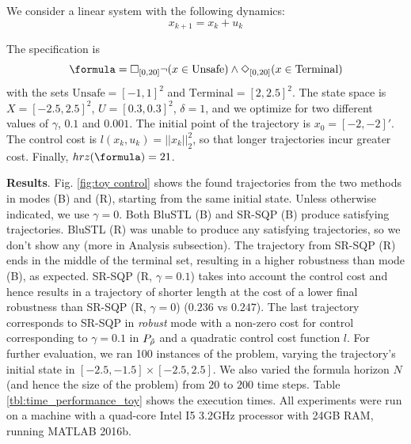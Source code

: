 \begin{exmp}
We consider a linear system with the following dynamics:
\begin{equation}
\label{eq:PointMass}
x_{k+1} = x_k + u_k
\end{equation}

The specification is 
\[\formula = \always_{[0,20]} \neg (x \in \text{Unsafe}) \land \eventually_{[0,20]} (x \in \text{Terminal})\]
with the sets $\text{Unsafe}=[-1,1]^2$ and $\text{Terminal}=[2,2.5]^2$. 
The state space is $X=[-2.5,2.5]^2$, $U=[0.3,0.3]^2$, $\delta=1$, and we optimize for two different values of $\gamma$, $0.1$ and $0.001$. 
The initial point of the trajectory is $x_0=[-2,-2]'$. 
The control cost is $l(x_k,u_k) = ||x_k||_{2}^2$, so that longer trajectories incur greater cost. 
Finally, $hrz(\formula) = 21$.

\textbf{Results}.
Fig. \ref{fig:toy control} shows the found trajectories from the two methods in modes (B) and (R), starting from the same initial state. 
Unless otherwise indicated, we use $\gamma=0$.
Both BluSTL (B) and SR-SQP (B) produce satisfying trajectories.
BluSTL (R) was unable to produce any satisfying trajectories, so we don't show any (more in Analysis subsection).
The trajectory from SR-SQP (R) ends in the middle of the terminal set, resulting in a higher robustness than mode (B), as expected. 
SR-SQP (R, $\gamma=0.1$) takes into account the control cost and hence results in a trajectory of shorter length at the cost of a lower final robustness than SR-SQP (R, $\gamma = 0$) ($0.236$ vs $0.247$).
The last trajectory corresponds to SR-SQP in \textit{robust} mode with a non-zero cost for control corresponding to $\gamma=0.1$  in $P_{\tilde{\rho}}$ and a quadratic control cost function $l$. 
For further evaluation, we ran 100 instances of the problem, varying the trajectory's initial state in $[-2.5,-1.5] \times [-2.5,2.5]$.
We also varied the formula horizon $N$ (and hence the size of the problem) from $20$ to $200$ time steps. 
Table \ref{tbl:time_performance_toy} shows the execution times. 
All experiments were run on a machine with a quad-core Intel I5 3.2GHz processor with 24GB RAM, running MATLAB 2016b.



\end{exmp}
